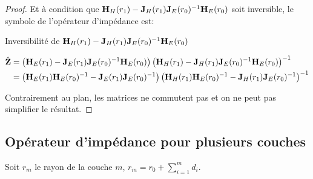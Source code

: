 \begin{proof}
            Et à condition que \(\mH_{H}(r_1) - \mJ_{H}(r_1)\mJ_{E}(r_0)^{-1}\mH_{E}(r_0)\) soit inversible, le symbole de l'opérateur d'impédance est:
            \begin{TODO}
  Inversibilité de \(\mH_{H}(r_1) - \mJ_{H}(r_1)\mJ_{E}(r_0)^{-1}\mH_{E}(r_0)\)
\end{TODO}
            \begin{align}
                \hat \mZ &= 
                \left(\mH_{E}(r_1) - \mJ_{E}(r_1)\mJ_{E}(r_0)^{-1}\mH_{E}(r_0)\right)
                \left(\mH_{H}(r_1) - \mJ_{H}(r_1)\mJ_{E}(r_0)^{-1}\mH_{E}(r_0)\right)^{-1}
                \\
                &=
                \left(\mH_{E}(r_1)\mH_{E}(r_0)^{-1} - \mJ_{E}(r_1)\mJ_{E}(r_0)^{-1}\right)
                \left(\mH_{H}(r_1)\mH_{E}(r_0)^{-1} - \mJ_{H}(r_1)\mJ_{E}(r_0)^{-1}\right)^{-1}
            \end{align}

            Contrairement au plan, les matrices ne commutent pas et on ne peut pas simplifier le résultat.

        \end{proof}



    \subsection{Opérateur d'impédance pour plusieurs couches}

        \begin{figure}[!hbt]
            \centering
            \begin{tikzpicture}
                
            \end{tikzpicture}
        \end{figure}

        Soit \(r_m\) le rayon de la couche \(m\), \(r_m = r_0 +\sum_{i=1}^{m} d_{i}\). 

